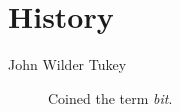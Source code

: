 \chapter{History}

\begin{description}
  \item[John Wilder Tukey] Coined the term \textit{bit}.
\end{description}

